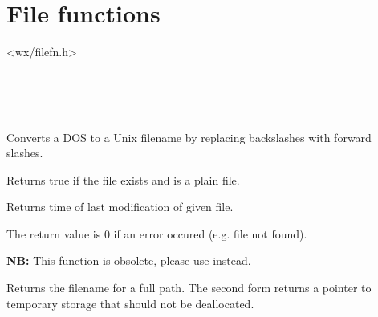 \section{File functions}\label{filefunctions}


<wx/filefn.h>


\\
\\
\\


\label{wxdos2unixfilename}


Converts a DOS to a Unix filename by replacing backslashes with forward
slashes.


\label{functionwxfileexists}


Returns true if the file exists and is a plain file.


\label{wxfilemodificationtime}


Returns time of last modification of given file.

The return value is $0$ if an error occured (e.g. file not found).


\label{wxfilenamefrompath}



{\bf NB:} This function is obsolete, please use
 instead.

Returns the filename for a full path. The second form returns a pointer to
temporary storage that should not be deallocated.


\label{wxfindfirstfile}


